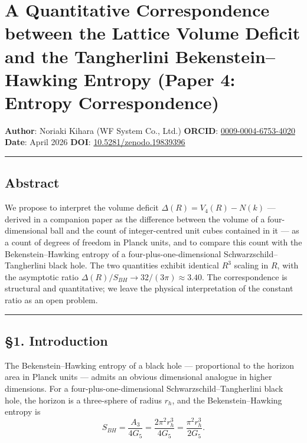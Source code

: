 \documentclass[a4paper,11pt]{article}
\theoremstyle{definition}
\begin{document}
\section{A Quantitative Correspondence between the Lattice Volume
Deficit and the Tangherlini Bekenstein--Hawking Entropy (Paper 4:
Entropy
Correspondence)}\label{a-quantitative-correspondence-between-the-lattice-volume-deficit-and-the-tangherlini-bekensteinhawking-entropy-paper-4-entropy-correspondence}

\textbf{Author}: Noriaki Kihara (WF System Co., Ltd.) \textbf{ORCID}:
\href{https://orcid.org/0009-0004-6753-4020}{0009-0004-6753-4020}
\textbf{Date}: April 2026 \textbf{DOI}:
\href{https://doi.org/10.5281/zenodo.19839396}{10.5281/zenodo.19839396}

\begin{center}\rule{0.5\linewidth}{0.5pt}\end{center}

\subsection{Abstract}\label{abstract}

We propose to interpret the volume deficit \(\Delta(R) = V_4(R) - N(k)\)
--- derived in a companion paper as the difference between the volume of
a four-dimensional ball and the count of integer-centred unit cubes
contained in it --- as a count of degrees of freedom in Planck units,
and to compare this count with the Bekenstein--Hawking entropy of a
four-plus-one-dimensional Schwarzschild--Tangherlini black hole. The two
quantities exhibit identical \(R^3\) scaling in \(R\), with the
asymptotic ratio \(\Delta(R) / S_{BH} \to 32/(3\pi) \approx 3.40\). The
correspondence is structural and quantitative; we leave the physical
interpretation of the constant ratio as an open problem.

\begin{center}\rule{0.5\linewidth}{0.5pt}\end{center}

\subsection{§1. Introduction}\label{introduction}

The Bekenstein--Hawking entropy of a black hole --- proportional to the
horizon area in Planck units --- admits an obvious dimensional analogue
in higher dimensions. For a four-plus-one-dimensional
Schwarzschild--Tangherlini black hole, the horizon is a three-sphere of
radius \(r_h\), and the Bekenstein--Hawking entropy is
\[S_{BH} = \frac{A_3}{4 G_5} = \frac{2\pi^2 r_h^3}{4 G_5} = \frac{\pi^2 r_h^3}{2 G_5}.\]
\end{document}
